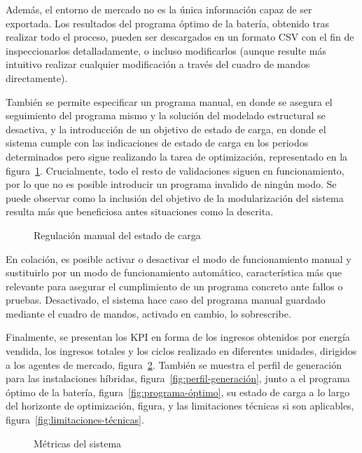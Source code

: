 Además, el entorno de mercado no es la única información capaz de ser exportada. Los resultados del programa óptimo de la batería, obtenido tras realizar todo el proceso, pueden ser descargados en un formato CSV con el fin de inspeccionarlos detalladamente, o incluso modificarlos (aunque resulte más intuitivo realizar cualquier modificación a través del cuadro de mandos directamente).

También se permite especificar un programa manual, en donde se asegura el seguimiento del programa mismo y la solución del modelado estructural se desactiva, y la introducción de un objetivo de estado de carga, en donde el sistema cumple con las indicaciones de estado de carga en los periodos determinados pero sigue realizando la tarea de optimización, representado en la figura~\ref{fig:soc-manual}. Crucialmente, todo el resto de validaciones siguen en funcionamiento, por lo que no es posible introducir un programa invalido de ningún modo. Se puede observar como la inclusión del objetivo de la modularización del sistema resulta más que beneficiosa antes situaciones como la descrita.

\begin{figure}
  \centering
  \caption{Regulación manual del estado de carga}
  \label{fig:soc-manual}
\end{figure}

En colación, es posible activar o desactivar el modo de funcionamiento manual y sustituirlo por un modo de funcionamiento automático, característica más que relevante para asegurar el cumplimiento de un programa concreto ante fallos o pruebas. Desactivado, el sistema hace caso del programa manual guardado mediante el cuadro de mandos, activado en cambio, lo sobrescribe.

Finalmente, se presentan los KPI en forma de los ingresos obtenidos por energía vendida, los ingresos totales y los ciclos realizado en diferentes unidades, dirigidos a los agentes de mercado, figura~\ref{fig:kpi-sistema}. También se muestra el perfil de generación para las instalaciones híbridas, figura~\ref{fig:perfil-generación}, junto a el programa óptimo de la batería, figura~\ref{fig:programa-óptimo}, su estado de carga a lo largo del horizonte de optimización, figura, y las limitaciones técnicas si son aplicables, figura~\ref{fig:limitaciones-técnicas}.

\begin{figure}
  \centering
  \caption{Métricas del sistema}
  \label{fig:kpi-sistema}
\end{figure}

